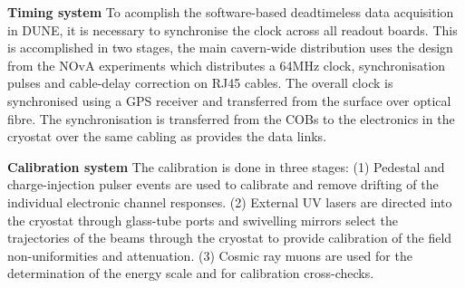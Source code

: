 {\bf Timing system} To acomplish the software-based deadtimeless data
acquisition in DUNE, it is necessary to synchronise the clock across
all readout boards.  This is accomplished in two stages, the main
cavern-wide distribution uses the design from the NOvA experiments
which distributes a 64MHz clock, synchronisation pulses and
cable-delay correction on RJ45 cables.  The overall clock is
synchronised using a GPS receiver and transferred from the surface
over optical fibre.  The synchronisation is transferred from the COBs
to the electronics in the cryostat over the same cabling as provides
the data links.

{\bf Calibration system} The calibration is done in three stages: (1)
Pedestal and charge-injection pulser events are used to calibrate and
remove drifting of the individual electronic channel responses. (2)
External UV lasers are directed into the cryostat through glass-tube
ports and swivelling mirrors select the trajectories of the beams
through the cryostat to provide calibration of the field
non-uniformities and attenuation. (3) Cosmic ray muons are used for
the determination of the energy scale and for calibration
cross-checks.

